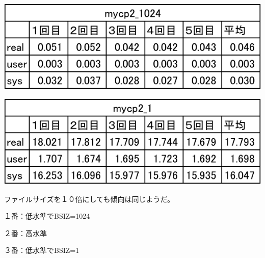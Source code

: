 \documentclass[a4j,dvipdfmx]{jarticle}
\begin{document}
\begin{enumerate}
\begin{multicols}{2}
\includegraphics[scale=.7]{mycp2_1024_10M-crop.pdf}

\includegraphics[scale=.7]{mycp2_1_10M-crop.pdf}

ファイルサイズを１０倍にしても傾向は同じようだ。

１番：低水準でBSIZ=1024

２番：高水準

３番：低水準でBSIZ=1

\end{multicols}

\end{enumerate}
\end{document}
